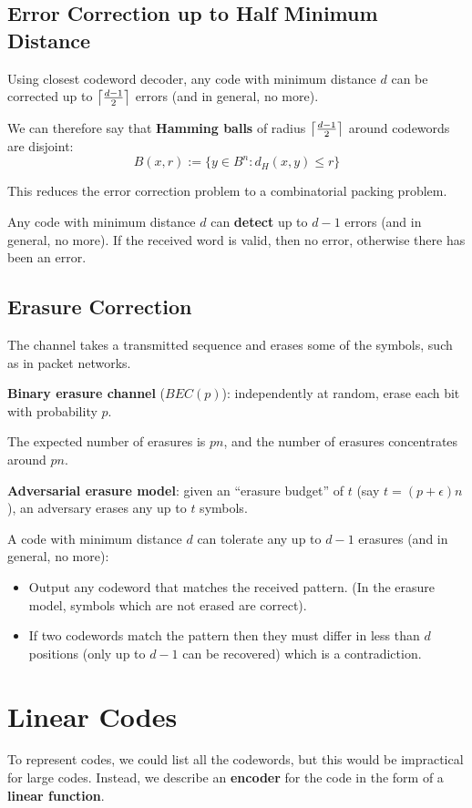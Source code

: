 \documentclass[11pt]{article}
\DeclarePairedDelimiter\ceil{\lceil}{\rceil}
\begin{document}
\subsection{Error Correction up to Half Minimum Distance}
Using closest codeword decoder, any code with minimum distance $d$ can be corrected up to $\ceil*{\frac{d - 1}{2}}$ errors (and in general, no more).

We can therefore say that \textbf{Hamming balls} of radius $\ceil*{\frac{d - 1}{2}}$ around codewords are disjoint:
\[
  B(x, r) := \{ y \in B^n : d_H (x, y) \leq r \}
\]

This reduces the error correction problem to a combinatorial packing problem.

Any code with minimum distance $d$ can \textbf{detect} up to $d - 1$ errors (and in general, no more).
If the received word is valid, then no error, otherwise there has been an error.

\subsection{Erasure Correction}
The channel takes a transmitted sequence and erases some of the symbols, such as in packet networks.

\textbf{Binary erasure channel} ($BEC(p)$): independently at random, erase each bit with probability $p$.

The expected number of erasures is $pn$, and the number of erasures concentrates around $pn$.

\textbf{Adversarial erasure model}: given an ``erasure budget'' of $t$ (say $t = (p + \epsilon)n$), an adversary erases any up to $t$ symbols.

A code with minimum distance $d$ can tolerate any up to $d - 1$ erasures (and in general, no more):
\begin{itemize}
  \item Output any codeword that matches the received pattern. (In the erasure model, symbols which are not erased are correct).
  \item If two codewords match the pattern then they must differ in less than $d$ positions (only up to $d - 1$ can be recovered) which is a contradiction.
\end{itemize}

\section{Linear Codes}
To represent codes, we could list all the codewords, but this would be impractical for large codes.
Instead, we describe an \textbf{encoder} for the code in the form of a \textbf{linear function}.
\end{document}
